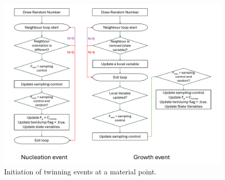 \begin{figure}[H]
    \centering
    \includegraphics[width=\textwidth]{images/Flow_chart_twin_events.pdf}
    \caption{Initiation of twinning events at a material point.}
    \label{Flow_chart_twin_events}
\end{figure}


